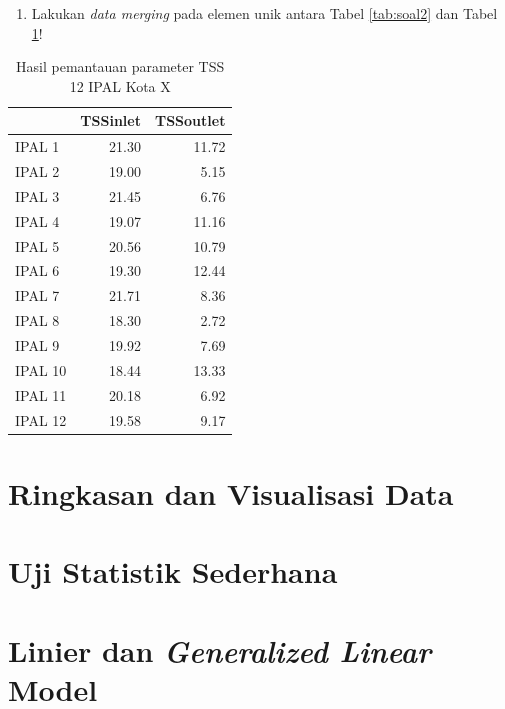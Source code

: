\documentclass[12pt,]{krantz}
\providecommand{\tightlist}{%
  \setlength{\itemsep}{0pt}\setlength{\parskip}{0pt}}
\begin{document}
\begin{enumerate}
\def\labelenumi{\arabic{enumi}.}
\setcounter{enumi}{2}
\tightlist
\item
  Lakukan \emph{data merging} pada elemen unik antara Tabel \ref{tab:soal2} dan Tabel \ref{tab:soal3}!
\end{enumerate}

\begin{table}

\caption{\label{tab:soal3}Hasil pemantauan parameter TSS 12 IPAL Kota X}
\centering
\begin{tabular}[t]{l|r|r}
\hline
  & TSSinlet & TSSoutlet\\
\hline
IPAL 1 & 21.30 & 11.72\\
\hline
IPAL 2 & 19.00 & 5.15\\
\hline
IPAL 3 & 21.45 & 6.76\\
\hline
IPAL 4 & 19.07 & 11.16\\
\hline
IPAL 5 & 20.56 & 10.79\\
\hline
IPAL 6 & 19.30 & 12.44\\
\hline
IPAL 7 & 21.71 & 8.36\\
\hline
IPAL 8 & 18.30 & 2.72\\
\hline
IPAL 9 & 19.92 & 7.69\\
\hline
IPAL 10 & 18.44 & 13.33\\
\hline
IPAL 11 & 20.18 & 6.92\\
\hline
IPAL 12 & 19.58 & 9.17\\
\hline
\end{tabular}
\end{table}

\hypertarget{ringkasan-dan-visualisasi-data}{%
\chapter{Ringkasan dan Visualisasi Data}\label{ringkasan-dan-visualisasi-data}}

\hypertarget{uji-statistik-sederhana}{%
\chapter{Uji Statistik Sederhana}\label{uji-statistik-sederhana}}

\hypertarget{linier-dan-generalized-linear-model}{%
\chapter{\texorpdfstring{Linier dan \emph{Generalized Linear} Model}{Linier dan Generalized Linear Model}}\label{linier-dan-generalized-linear-model}}
\end{document}
